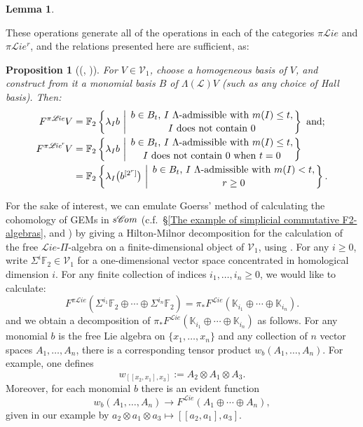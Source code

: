 \documentclass[11pt]{amsart} \renewcommand{\baselinestretch}{1.2}
\theoremstyle{plain}
\newtheorem{lem}[thm]{Lemma}
\newtheorem{prop}[thm]{Proposition}
\numberwithin{equation}{section} %
\theoremstyle{plain}
\newtheorem{lem}[thm]{Lemma}
\newtheorem{prop}[thm]{Proposition}
\numberwithin{equation}{chapter} %
\renewcommand{\to}{\longrightarrow}
\newcommand{\scrL}{\mathscr{L}}
\newcommand{\scrC}{\mathscr{C}}
\newcommand{\calV}{\mathcal{V}}
\newcommand{\citeBOX}[2][]{\cite[\mbox{#1}]{#2}}
\newcommand{\LieOperad}{{\scrL}}
\newcommand{\restnRepeated}[2]{#1^{[2^{#2}]}}
\newcommand{\vect}[2]{\calV^{#1}_{#2}}
\newcommand{\PA}[1]{\pi#1}
\newcommand{\minDimDelta}{m}
\newcommand{\F}{\mathbb{F}}
\newcommand{\algs}{{\scrC\!\textit{\normalfont\textit{om}}}}
\newcommand{\liealgs}{{\scrL\!\textit{ie}}}
\newcommand{\restliealgs}{{\scrL\!\textit{ie}^\textit{r}}}
\newcommand{\Ftwo}{\F_2}
\renewcommand{\mapsto}{\longmapsto}
\begin{document}
\begin{Constructing homotopy operations}
\begin{lem}
\end{lem}
These operations generate all of the operations in each of the categories $\PA{\liealgs}$ and $\PA{\restliealgs}$, and the relations presented here are sufficient, as:
\begin{prop}[{(\cite[Theorem 8.8 and proof]{CurtisSimplicialHtpy.pdf}, \cite{6Author.pdf})}]
\label{Lie homotopy operations}
For $V\in\vect{}{1}$,   choose a homogeneous basis of $V$, and construct from it a monomial  basis $B$ of $\Lambda(\LieOperad)V$ (such as any choice of Hall basis). Then:
\begin{align*}
F^{\PA{\liealgs}}V&=\Ftwo \left\{\lambda_Ib\ \middle|\ \genfrac{}{}{0pt}{}{b\in B_t\textup{, $I$ $\Lambda$-admissible with }\minDimDelta(I)\leq t,}{\textup{$I$ does not contain 0}}\right\}\textup{ and;}
\\
F^{\PA{\restliealgs}}V&=\Ftwo \left\{\lambda_Ib\ \middle|\ \genfrac{}{}{0pt}{}{b\in B_t\textup{, $I$ $\Lambda$-admissible with }\minDimDelta(I)\leq t,}{\textup{$I$ does not contain 0 when $t=0$}}\right\}
\\
&=\Ftwo \left\{\lambda_I\bigl(\restnRepeated{b}{r}\bigr)\ \middle|\ \genfrac{}{}{0pt}{}{b\in B_t\textup{, $I$ $\Lambda$-admissible with }\minDimDelta(I)< t,}{\textup{$r\geq0$}}\right\}.
\end{align*}
\end{prop}
For the sake of interest, we can  emulate  Goerss' method of calculating the cohomology of GEMs in $s\algs$ (c.f.\ \S\ref{The example of simplicial commutative F2-algebras}, \cite{GoerssHiltonMilnor.pdf} and \citeBOX[\S11]{MR1089001}) by giving a Hilton-Milnor decomposition for the calculation of the free $\liealgs$-$\Pi$-algebra on a finite-dimensional object of $\vect{}{1}$, using \cite[Proposition 3.1]{Schles-SimpLieRing.pdf}. For any $i\geq0$, write $\Sigma^i\Ftwo \in\vect{}{1}$ for a one-dimensional vector space concentrated in homological dimension $i$.
For any finite collection of indices $i_1,\ldots,i_n\geq 0$, we would like to calculate:
\[F^{\PA{\liealgs}}(\Sigma^{i_1}\Ftwo\oplus\cdots \oplus\Sigma^{i_n}\Ftwo)=\pi_*F^\liealgs(\mathbb{K}_{i_1}\oplus\cdots \oplus \mathbb{K}_{i_n}).\]
and we obtain a decomposition of $\pi_*F^\liealgs(\mathbb{K}_{i_1}\oplus\cdots \oplus \mathbb{K}_{i_n})$ as follows. For any monomial $b$ is the free Lie algebra on $\{x_1,\ldots,x_n\}$ and any collection of $n$ vector spaces $A_{1},\ldots,A_n$, there is a corresponding tensor product $w_b(A_{1},\ldots,A_n)$. For example, one defines
\[w_{[[x_2,x_1],x_3]}:=A_2\otimes A_1\otimes A_3.\]
Moreover, for each monomial $b$ there is an evident function \[w_b(A_1,\ldots,A_n)\to F^\liealgs(A_1\oplus\cdots\oplus A_n),\]
given in our example by $a_2\otimes a_1\otimes a_3\mapsto [[a_2,a_1],a_3]$.


\end{Constructing homotopy operations}
\end{document}
